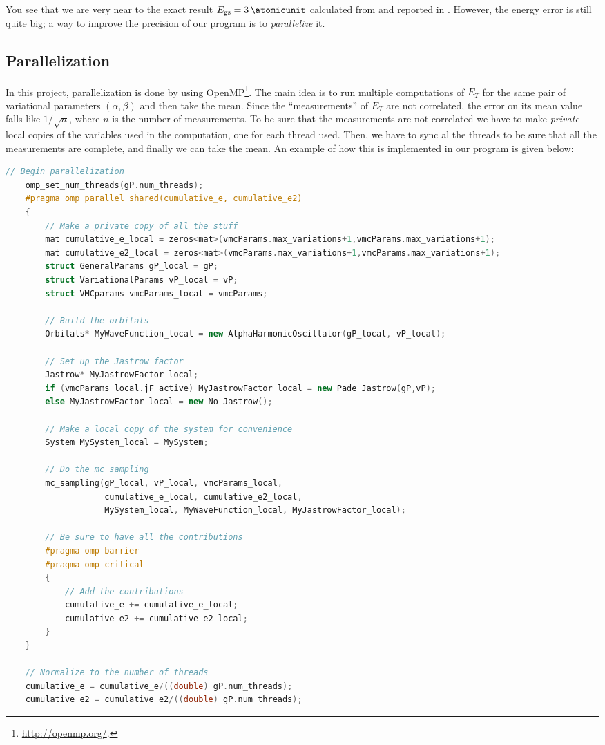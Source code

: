 \documentclass[a4paper,twoside,11pt]{book}
\begin{document}
You see that we are very near to the exact result $E_{\text{gs}} = \SI{3}{\atomicunit}$ calculated from \cite{taut} and reported in \cite{pede}. However, the energy error is still quite big; a way to improve the precision of our program is to \emph{parallelize} it.

\subsection{Parallelization}

In this project, parallelization is done by using OpenMP\footnote{\url{http://openmp.org/}.}. The main idea is to run multiple computations of $E_T$ for the same pair of variational parameters $(\alpha,\beta)$ and then take the mean. Since the ``measurements'' of $E_T$ are not correlated, the error on its mean value falls like $1/\sqrt{n}$, where $n$ is the number of measurements. To be sure that the measurements are not correlated we have to make \emph{private} local copies of the variables used in the computation, one for each thread used. Then, we have to sync al the threads to be sure that all the measurements are complete, and finally we can take the mean. An example of how this is implemented in our program is given below:

\begin{lstlisting}[language=cpp]
    // Begin parallelization
    omp_set_num_threads(gP.num_threads);
    #pragma omp parallel shared(cumulative_e, cumulative_e2)
    {
        // Make a private copy of all the stuff
        mat cumulative_e_local = zeros<mat>(vmcParams.max_variations+1,vmcParams.max_variations+1);
        mat cumulative_e2_local = zeros<mat>(vmcParams.max_variations+1,vmcParams.max_variations+1);
        struct GeneralParams gP_local = gP;
        struct VariationalParams vP_local = vP;
        struct VMCparams vmcParams_local = vmcParams;

        // Build the orbitals
        Orbitals* MyWaveFunction_local = new AlphaHarmonicOscillator(gP_local, vP_local);

        // Set up the Jastrow factor
        Jastrow* MyJastrowFactor_local;
        if (vmcParams_local.jF_active) MyJastrowFactor_local = new Pade_Jastrow(gP,vP);
        else MyJastrowFactor_local = new No_Jastrow();

        // Make a local copy of the system for convenience
        System MySystem_local = MySystem;

        // Do the mc sampling
        mc_sampling(gP_local, vP_local, vmcParams_local,
                    cumulative_e_local, cumulative_e2_local,
                    MySystem_local, MyWaveFunction_local, MyJastrowFactor_local);

        // Be sure to have all the contributions
        #pragma omp barrier
        #pragma omp critical
        {
            // Add the contributions
            cumulative_e += cumulative_e_local;
            cumulative_e2 += cumulative_e2_local;
        }
    }

    // Normalize to the number of threads
    cumulative_e = cumulative_e/((double) gP.num_threads);
    cumulative_e2 = cumulative_e2/((double) gP.num_threads);
\end{lstlisting}
\end{document}
